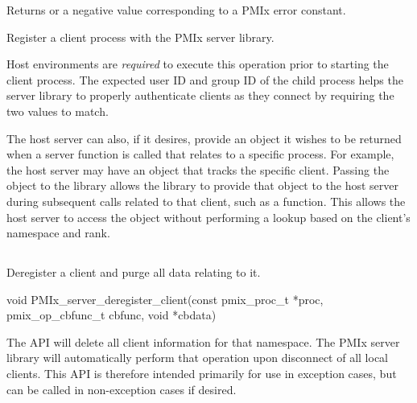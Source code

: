 Returns  or a negative value corresponding to a PMIx error constant.

\descr

Register a client process with the PMIx server library.

\advicermstart
Host environments are \textit{required} to execute this operation prior to starting the client process.
The expected user ID and group ID of the child process helps the server library to properly authenticate clients as they connect by requiring the two values to match.
\advicermend

The host server can also, if it desires, provide an object it wishes to be returned when a server function is called that relates to a specific process.
For example, the host server may have an object that tracks the specific client.
Passing the object to the library allows the library to provide that object to the host server during subsequent calls related to that client, such as a  function.  This allows the host server to access the object without performing a lookup based on the client's namespace and rank.


\subsection{}

\summary

Deregister a client and purge all data relating to it.

\format

\cspecificstart
\begin{codepar}
void
PMIx_server_deregister_client(const pmix_proc_t *proc,
                        pmix_op_cbfunc_t cbfunc, void *cbdata)
\end{codepar}
\cspecificend

\begin{arglist}
\end{arglist}


\descr

The  \ac{API} will delete all client information for that namespace. The \ac{PMIx} server library will automatically perform that operation upon disconnect of all local clients.
This \ac{API} is therefore intended primarily for use in exception cases, but can be called in non-exception cases if desired.


